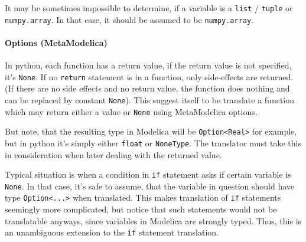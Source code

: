 \documentclass[a4paper,10pt]{article}
\begin{document}
It may be sometimes impossible to determine, if a variable is a {\tt list} / {\tt tuple} or {\tt numpy.array}. In that case,
it should be assumed to be {\tt numpy.array}.


\paragraph{Options (MetaModelica)}
In python, each function has a return value, if the return value is not specified, it's {\tt None}. 
If no {\tt return} statement is in a function, only side-effects are returned. (If there are no side effects 
and no return value, the function does nothing and can be replaced by constant {\tt None}).
This suggest itself to be translate a function which may return either a value or {\tt None} using MetaModelica options.

But note, that the resulting type in Modelica will be {\tt Option<Real>} for example, but in python it's simply either {\tt float} or
{\tt NoneType}. The translator must take this in consideration when later dealing with the returned value.

Typical situation is when a condition in {\tt if} statement asks if certain variable is {\tt None}. In that case, it's safe to assume,
that the variable in question should have type {\tt Option<...>} when translated. This makes translation of {\tt if} statements 
seemingly more complicated, but notice that such statements would not be translatable anyways, since variables in Modelica are strongly typed.
Thus, this is an unambiguous extension to the {\tt if} statement translation.
\end{document}
